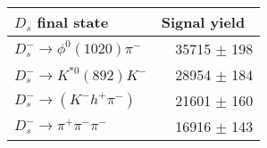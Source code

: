  \begin{tabular}{l r }
\hline\hline
$D_s$ final state  & Signal yield\ \\
\hline
$D_{s}^{-} \to \phi^{0}(1020)\pi^{-}$ & 35715 $\pm$ 198 \\
$D_{s}^{-}\to K^{*0}(892)K^{-}$ & 28954 $\pm$ 184 \\
$D_{s}^{-}\to (K^{-}h^{+}\pi^{-})$ & 21601 $\pm$ 160 \\
$D_{s}^{-}\to \pi^{+}\pi^{-}\pi^{-}$ & 16916 $\pm$ 143 \\
\hline\hline
\end{tabular}
\label{table:normYieldsDs}
